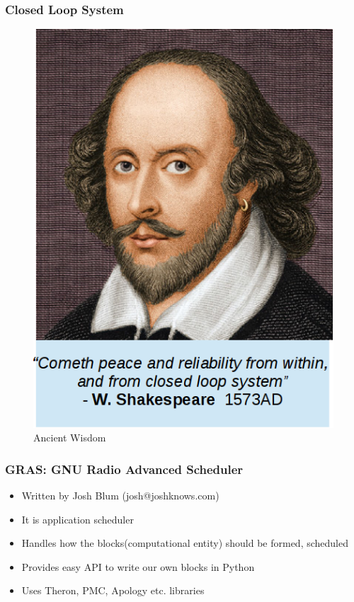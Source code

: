 \documentclass{beamer}
\begin{document}
\begin{frame}
    \frametitle{Closed Loop System}

    \begin{figure}
        \centering
        \begin{minipage}{.5\textwidth}
            \centering
            \includegraphics[width=.9\linewidth]{my_img/shaku1.png}
            \caption{Ancient Wisdom}
        \end{minipage}%
    \end{figure}

\end{frame}

\begin{frame}
        \frametitle{GRAS: GNU Radio Advanced Scheduler}
        \begin{itemize}
    \item Written by Josh Blum (josh@joshknows.com)
    \item It is application scheduler
    \item Handles how the blocks(computational entity) should be formed, scheduled
    \item Provides easy API to write our own blocks in Python
    \item Uses Theron, PMC, Apology etc. libraries
        \end{itemize}

\end{frame}
\end{document}
